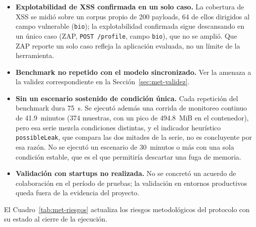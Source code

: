 \begin{itemize}
        \item \textbf{Explotabilidad de XSS confirmada en un solo caso.} La cobertura de XSS se midió
    sobre un corpus propio de 200 payloads, 64 de ellos dirigidos al campo vulnerable
    (\texttt{bio}); la explotabilidad confirmada sigue descansando en un único caso (ZAP,
    \texttt{POST /profile}, campo \texttt{bio}), que no se amplió. Que ZAP reporte un solo caso
    refleja la aplicación evaluada, no un límite de la herramienta.
    \item \textbf{Benchmark no repetido con el modelo sincronizado.} Ver la amenaza a la validez
    correspondiente en la Sección~\ref{sec:met-validez}.
    \item \textbf{Sin un escenario sostenido de condición única.} Cada repetición del benchmark
    dura 75~s. Se ejecutó además una corrida de monitoreo continuo de 41.9~minutos (374 muestras,
    con un pico de 494.8~MiB en el contenedor), pero esa serie mezcla condiciones distintas, y el
    indicador heurístico \texttt{possibleLeak}, que compara las dos mitades de la serie, no es
    concluyente por esa razón. No se ejecutó un escenario de 30~minutos o más con una sola condición
    estable, que es el que permitiría descartar una fuga de memoria.
    \item \textbf{Validación con startups no realizada.} No se concretó un acuerdo de
    colaboración en el período de pruebas; la validación en entornos productivos queda fuera de
    la evidencia del proyecto.
\end{itemize}

El Cuadro~\ref{tab:met-riesgos} actualiza los riesgos metodológicos del protocolo con su
estado al cierre de la ejecución.

